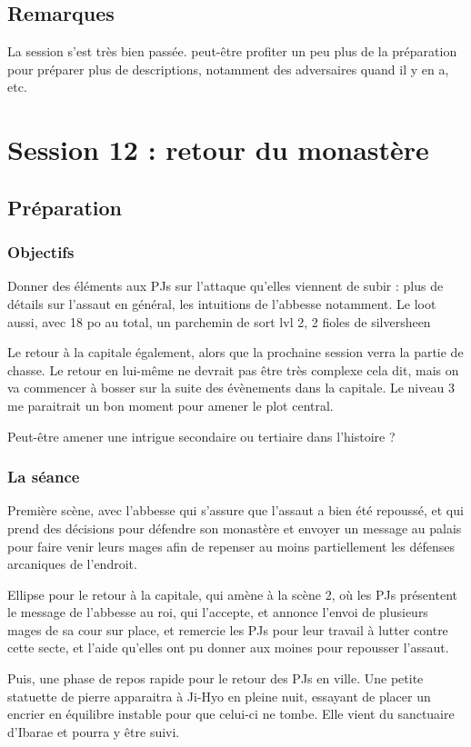 \documentclass[10pt,a4paper]{book}
\begin{document}
\subsection{Remarques}
La session s'est très bien passée. peut-être profiter un peu plus de la préparation pour préparer plus de descriptions, notamment des adversaires quand il y en a, etc.
\section{Session 12 : retour du monastère}
\subsection{Préparation}
\subsubsection{Objectifs}
Donner des éléments aux PJs sur l'attaque qu'elles viennent de subir : plus de détails sur l'assaut en général, les intuitions de l'abbesse notamment. Le loot aussi, avec 18 po au total, un parchemin de sort lvl 2, 2 fioles de silversheen

Le retour à la capitale également, alors que la prochaine session verra la partie de chasse. Le retour en lui-même ne devrait pas être très complexe cela dit, mais on va commencer à bosser sur la suite des évènements dans la capitale. Le niveau 3 me paraitrait un bon moment pour amener le plot central.

Peut-être amener une intrigue secondaire ou tertiaire dans l'histoire ?
\subsubsection{La séance}
Première scène, avec l'abbesse qui s'assure que l'assaut a bien été repoussé, et qui prend des décisions pour défendre son monastère et envoyer un message au palais pour faire venir leurs mages afin de repenser au moins partiellement les défenses arcaniques de l'endroit.

Ellipse pour le retour à la capitale, qui amène à la scène 2, où les PJs présentent le message de l'abbesse au roi, qui l'accepte, et annonce l'envoi de plusieurs mages de sa cour sur place, et remercie les PJs pour leur travail à lutter contre cette secte, et l'aide qu'elles ont pu donner aux moines pour repousser l'assaut.

Puis, une phase de repos rapide pour le retour des PJs en ville. Une petite statuette de pierre apparaitra à Ji-Hyo en pleine nuit, essayant de placer un encrier en équilibre instable pour que celui-ci ne tombe. Elle vient du sanctuaire d'Ibarae et pourra y être suivi.
\end{document}
